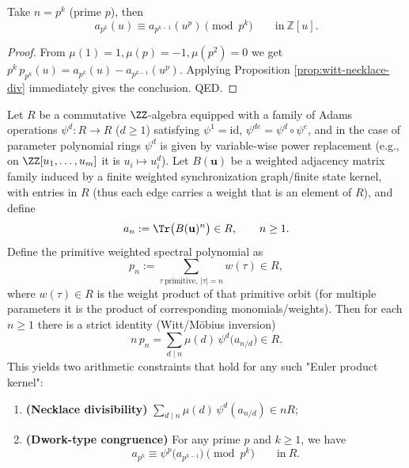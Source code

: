 \begin{corollary}\label{cor:witt-dwork-congruence}
Take $n=p^k$ (prime $p$), then
\[
a_{p^k}(u)\equiv a_{p^{k-1}}(u^p)\pmod{p^k}\qquad\text{in}\ \mathbb{Z}[u].
\]
\end{corollary}
\begin{proof}
From $\mu(1)=1,\mu(p)=-1,\mu(p^2)=0$ we get
\(
p^k\,p_{p^k}(u)=a_{p^k}(u)-a_{p^{k-1}}(u^p)
\).
Applying Proposition \ref{prop:witt-necklace-div} immediately gives the conclusion. QED.
\end{proof}



\begin{proposition}\label{prop:witt-necklace-dwork-R}
Let \(R\) be a commutative \(\ZZ\)-algebra equipped with a family of Adams operations \(\psi^d:R\to R\) (\(d\ge 1\)) satisfying
\(\psi^1=\mathrm{id}\), \(\psi^{de}=\psi^d\circ\psi^e\), and in the case of parameter polynomial rings \(\psi^d\) is given by variable-wise power replacement (e.g., on \(\ZZ[u_1,\dots,u_m]\) it is \(u_i\mapsto u_i^d\)).
Let \(B(\mathbf u)\) be a weighted adjacency matrix family induced by a finite weighted synchronization graph/finite state kernel, with entries in \(R\) (thus each edge carries a weight that is an element of \(R\)), and define
\[
a_n:=\Tr\bigl(B(\mathbf u)^n\bigr)\in R,\qquad n\ge 1.
\]
Define the primitive weighted spectral polynomial as
\[
p_n:=\sum_{\tau\ \mathrm{primitive},\,|\tau|=n} w(\tau)\in R,
\]
where \(w(\tau)\in R\) is the weight product of that primitive orbit (for multiple parameters it is the product of corresponding monomials/weights).
Then for each \(n\ge 1\) there is a strict identity (Witt/Möbius inversion)
\[
n\,p_n=\sum_{d\mid n}\mu(d)\,\psi^d\!\bigl(a_{n/d}\bigr)\in R.
\]
This yields two arithmetic constraints that hold for any such "Euler product kernel":
\begin{enumerate}
  \item \textbf{(Necklace divisibility)} \(\sum_{d\mid n}\mu(d)\,\psi^d(a_{n/d})\in nR\);
  \item \textbf{(Dwork-type congruence)} For any prime \(p\) and \(k\ge 1\), we have
  \[
  a_{p^k}\equiv \psi^{p}\!\bigl(a_{p^{k-1}}\bigr)\pmod{p^k}\qquad\text{in}\ R.
  \]
\end{enumerate}
\end{proposition}
